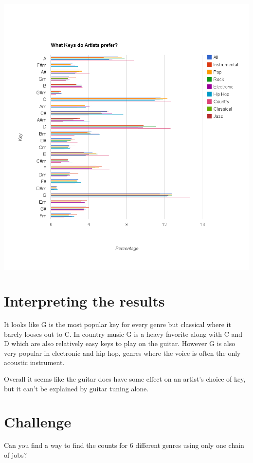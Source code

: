 \documentclass[letterpaper,10pt,openany,oneside]{sphinxmanual}
\begin{document}
{\hfill\includegraphics{keyChart.png}\hfill}


\section{Interpreting the results}
\label{1-Keys/Keys:interpreting-the-results}
It looks like G is the most popular key for every genre but
classical where it barely looses out to C. In country music G
is a heavy favorite along with C and D which are also relatively
easy keys to play on the guitar. However G is also very popular
in electronic and hip hop, genres where the voice is often the
only acoustic instrument.

Overall it seems like the guitar does have some effect on an
artist's choice of key, but it can't be explained by guitar
tuning alone.


\section{Challenge}
\label{1-Keys/Keys:challenge}
Can you find a way to find the counts for 6 different genres using only
one chain of jobs?
\end{document}
